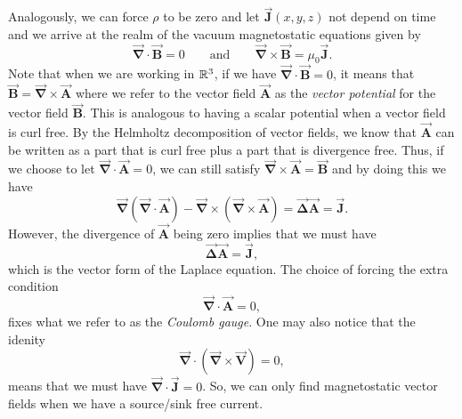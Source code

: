 \documentclass[12pt]{article} %
\newcommand{\vecfieldB}{\boldsymbol{\vec{B}}}
\newcommand{\vecfieldJ}{\boldsymbol{\vec{J}}}
\newcommand{\grad}{\boldsymbol{\vec{\nabla}}}
\newcommand{\veclaplace}{\boldsymbol{\vec{\Delta}}}
\newcommand{\vecfieldV}{\boldsymbol{\vec{V}}}
\newcommand{\vecfieldA}{\boldsymbol{\vec{A}}}
\begin{document}
\begin{solution}
\begin{enumerate}[(a)]
    Analogously, we can force $\rho$ to be zero and let $\vecfieldJ(x,y,z)$ not depend on time and we arrive at the realm of the vacuum magnetostatic equations given by
    \[
        \grad \cdot \vecfieldB = 0 \qquad \textrm{and} \qquad \grad \times \vecfieldB = \mu_0 \vecfieldJ.
    \]
    Note that when we are working in $\mathbb{R}^3$, if we have $\grad \cdot \vecfieldB=0$, it means that $\vecfieldB = \grad \times \vecfieldA$ where we refer to the vector field $\vecfieldA$ as the \emph{vector potential} for the vector field $\vecfieldB$.  This is analogous to having a scalar potential when a vector field is curl free. By the Helmholtz decomposition of vector fields, we know that $\vecfieldA$ can be written as a part that is curl free plus a part that is divergence free. Thus, if we choose to let $\grad \cdot \vecfieldA=0$, we can still satisfy $\grad \times \vecfieldA = \vecfieldB$ and by doing this we have
    \[
    \grad \left(\grad \cdot \vecfieldA\right) - \grad \times \left(\grad \times \vecfieldA\right)= \veclaplace \vecfieldA = \vecfieldJ.
    \]
    However, the divergence of $\vecfieldA$ being zero implies that we must have
    \[
    \veclaplace \vecfieldA = \vecfieldJ,
    \]
    which is the vector form of the Laplace equation.  The choice of forcing the extra condition
    \[
    \grad \cdot \vecfieldA=0,
    \]
    fixes what we refer to as the \emph{Coulomb gauge}.  One may also notice that the idenity
    \[
    \grad \cdot \left( \grad \times \vecfieldV \right) = 0,
    \]
    means that we must have $\grad \cdot \vecfieldJ=0$.  So, we can only find magnetostatic vector fields when we have a source/sink free current.
    

\end{enumerate}
\end{solution}
\end{document}
